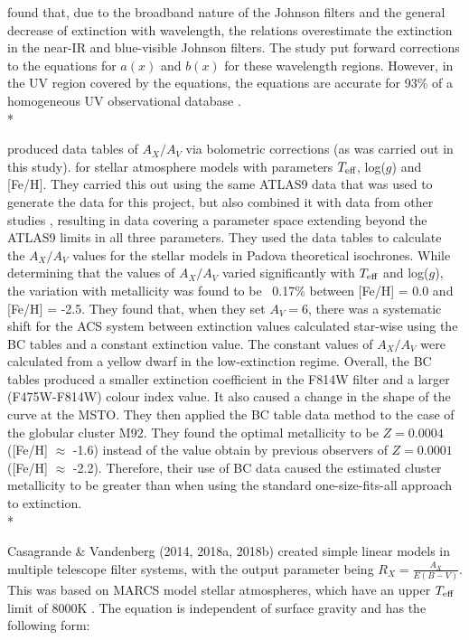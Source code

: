 \documentclass[12pt, a4paper]{report}
\begin{document}
\cite{1999PASP..111...63F} found that, due to the broadband nature of the Johnson filters and the general decrease of extinction with wavelength, the \cite{1989ApJ...345..245C} relations overestimate the extinction in the near-IR and blue-visible Johnson filters. The study put forward corrections to the equations for $a(x)$ and $b(x)$ for these wavelength regions. However, in the UV region covered by  the \cite{1989ApJ...345..245C} equations, the equations are accurate for 93\% of a homogeneous UV observational database \citep{2004ApJ...616..912V}.\\*

\cite{2008PASP..120..583G} produced data tables of $A_{X}/A_{V}$ via bolometric corrections (as was carried out in this study). for stellar atmosphere models with parameters $T_{\textnormal{eff}}$, log($g$) and [Fe/H]. They carried this out using the same ATLAS9 data \citep{2004astro.ph..5087C} that was used to generate the data for this project, but also combined it with data from other studies \cite{2002A&A...391..195G}, resulting in data covering a parameter space extending beyond the ATLAS9 limits in all three parameters. They used the data tables to calculate the $A_{X}/A_{V}$ values for the stellar models in Padova theoretical isochrones. While determining that the values of $A_{X}/A_{V}$ varied significantly with $T_{\textnormal{eff}}$ and log($g$), the variation with metallicity was found to be ~0.17$\%$ between [Fe/H] = 0.0 and [Fe/H] = -2.5. They found that, when they set $A_{V} = 6$, there was a systematic shift for the ACS system between extinction values calculated star-wise using the BC tables and a constant extinction value. The constant values of $A_{X}/A_{V}$ were calculated from a yellow dwarf in the low-extinction regime. Overall, the BC tables produced a smaller extinction coefficient in the F814W filter and a larger (F475W-F814W) colour index value. It also caused a change in the shape of the curve at the MSTO. They then applied the BC table data method to the case of the globular cluster M92. They found the optimal metallicity to be $Z = 0.0004$ ([Fe/H] $\approx$ -1.6) instead of the value obtain by previous observers of $Z = 0.0001$ ([Fe/H] $\approx$ -2.2). Therefore, their use of BC data caused the estimated cluster metallicity to be greater than when using the standard one-size-fits-all approach to extinction.\\*

Casagrande \& Vandenberg (2014, 2018a, 2018b) created simple linear models in multiple telescope filter systems, with the output parameter being $R_{X}  = \frac{A_{X}}{E(B-V)}$. This was based on MARCS model stellar atmospheres, which have an upper $T_{\textnormal{eff}}$ limit of 8000K \citep{2008A&A...486..951G}. The equation is independent of surface gravity and has the following form:
\end{document}
